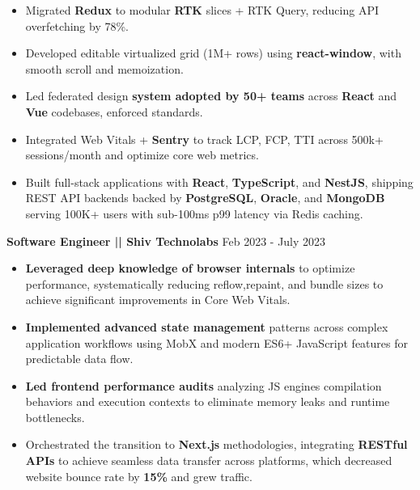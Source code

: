 \documentclass[a4paper]{article}
\begin{document}
\begin{itemize}
\item {Migrated \textbf{Redux} to modular \textbf{RTK} slices + RTK Query, reducing API overfetching by 78\%.}
\item {Developed editable virtualized grid (1M+ rows) using \textbf{react-window}, with smooth scroll and memoization.}
\item {Led federated design \textbf{system adopted by 50+ teams} across \textbf{React} and \textbf{Vue} codebases, enforced standards.}
\item {Integrated Web Vitals + \textbf{Sentry} to track LCP, FCP, TTI across 500k+ sessions/month and optimize core web metrics.}
\item {Built full-stack applications with \textbf{React}, \textbf{TypeScript}, and \textbf{NestJS}, shipping REST API backends backed by \textbf{PostgreSQL}, \textbf{Oracle}, and \textbf{MongoDB} serving 100K+ users with sub-100ms p99 latency via Redis caching.}

\end{itemize}




\vspace{4pt}
\textbf{Software Engineer || Shiv Technolabs}
\hfill Feb 2023 - July 2023
\begin{itemize}
\vspace{1pt}

\item {\textbf{Leveraged deep knowledge of browser internals} to optimize performance, systematically reducing reflow,repaint, and bundle sizes to achieve significant improvements in Core Web Vitals.}
\item {\textbf{Implemented advanced state management} patterns across complex application workflows using MobX and modern ES6+ JavaScript features for predictable data flow.}
\item {\textbf{Led frontend performance audits} analyzing JS engines compilation behaviors and execution contexts to eliminate memory leaks and runtime bottlenecks.}
\item {Orchestrated the transition to \textbf{Next.js} methodologies, integrating \textbf{RESTful APIs} to achieve seamless data transfer across platforms, which decreased website bounce rate by \textbf{15\%} and grew traffic.}
\end{itemize}
\end{document}
